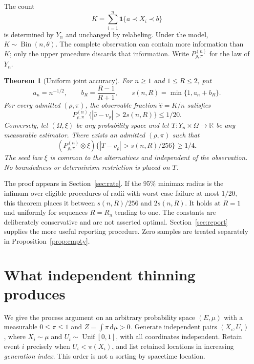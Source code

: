 \documentclass[11pt]{article}
\newtheorem{theorem}{Theorem}[section]
\theoremstyle{remark}
\newcommand{\R}{\mathbb R}
\newcommand{\Bin}{\operatorname{Bin}}
\newcommand{\dd}{\,\mathrm d}
\newcommand{\ind}{\mathbf 1}
\begin{document}
The count
\[
 K=\sum_{i=1}^n\ind\{a\prec X_i\prec b\}
\]
is determined by $Y_n$ and unchanged by relabeling. Under the model,
$K\sim\Bin(n,\theta)$. The complete observation can contain more
information than $K$; only the upper procedure discards that information.
Write $P_{\rho,\pi}^{(n)}$ for the law of $Y_n$.

\begin{theorem}[Uniform joint accuracy]\label{thm:main}
For $n\ge1$ and $1\le R\le2$, put
\[
 a_n=n^{-1/2},\qquad b_R=\frac{R-1}{R+1},\qquad
 s(n,R)=\min\{1,a_n+b_R\}.
\]
For every admitted $(\rho,\pi)$, the observable fraction $\widehat v=K/n$
satisfies
\begin{equation}\label{eq:upper}
 P_{\rho,\pi}^{(n)}\{|\widehat v-v_\rho|>2s(n,R)\}\le1/20.
\end{equation}
Conversely, let $(\Omega,\xi)$ be any probability space and let
$T:Y_n\times\Omega\to\R$ be any measurable estimator. There exists an
admitted $(\rho,\pi)$ such that
\begin{equation}\label{eq:lower}
 (P_{\rho,\pi}^{(n)}\otimes\xi)
 \{|T-v_\rho|>s(n,R)/256\}\ge1/4.
\end{equation}
The seed law $\xi$ is common to the alternatives and independent of the
observation. No boundedness or determinism restriction is placed on $T$.
\end{theorem}

The proof appears in Section~\ref{sec:rate}. If the 95\% minimax radius is
the infimum over eligible procedures of radii with worst-case failure at
most $1/20$, this theorem places it between $s(n,R)/256$ and $2s(n,R)$.
It holds at $R=1$ and uniformly for sequences $R=R_n$ tending to one.
The constants are deliberately conservative and are not asserted optimal.
Section~\ref{sec:report} supplies the more useful reporting procedure.
Zero samples are treated separately in Proposition~\ref{prop:empty}.

\section{What independent thinning produces}\label{sec:thinning}
We give the process argument on an arbitrary probability space
$(E,\mu)$ with a measurable $0\le\pi\le1$ and $Z=\int\pi\dd\mu>0$.
Generate independent pairs $(X_i,U_i)$, where $X_i\sim\mu$ and
$U_i\sim\operatorname{Unif}[0,1]$, with all coordinates independent.
Retain event $i$ precisely when $U_i<\pi(X_i)$, and list retained
locations in increasing \emph{generation index}. This order is not a
sorting by spacetime location.
\end{document}
